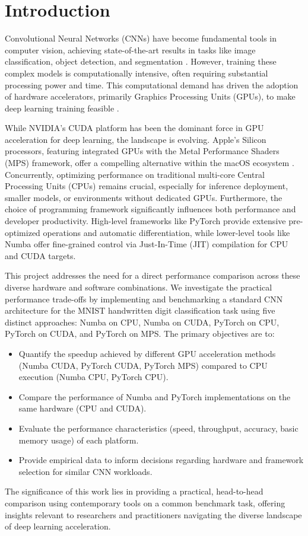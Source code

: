 \documentclass[conference]{IEEEtran} %
\begin{document}

\section{Introduction}
\label{sec:introduction}
Convolutional Neural Networks (CNNs) have become fundamental tools in computer vision, achieving state-of-the-art results in tasks like image classification, object detection, and segmentation \cite{Krizhevsky2012}. However, training these complex models is computationally intensive, often requiring substantial processing power and time. This computational demand has driven the adoption of hardware accelerators, primarily Graphics Processing Units (GPUs), to make deep learning training feasible \cite{Krizhevsky2012, Sze2017}.

While NVIDIA's CUDA platform has been the dominant force in GPU acceleration for deep learning, the landscape is evolving. Apple's Silicon processors, featuring integrated GPUs with the Metal Performance Shaders (MPS) framework, offer a compelling alternative within the macOS ecosystem \cite{Hubner2025}. Concurrently, optimizing performance on traditional multi-core Central Processing Units (CPUs) remains crucial, especially for inference deployment, smaller models, or environments without dedicated GPUs. Furthermore, the choice of programming framework significantly influences both performance and developer productivity. High-level frameworks like PyTorch provide extensive pre-optimized operations and automatic differentiation, while lower-level tools like Numba offer fine-grained control via Just-In-Time (JIT) compilation for CPU and CUDA targets.

This project addresses the need for a direct performance comparison across these diverse hardware and software combinations. We investigate the practical performance trade-offs by implementing and benchmarking a standard CNN architecture for the MNIST handwritten digit classification task \cite{LeCun1998} using five distinct approaches: Numba on CPU, Numba on CUDA, PyTorch on CPU, PyTorch on CUDA, and PyTorch on MPS. The primary objectives are to:
\begin{itemize}
    \item Quantify the speedup achieved by different GPU acceleration methods (Numba CUDA, PyTorch CUDA, PyTorch MPS) compared to CPU execution (Numba CPU, PyTorch CPU).
    \item Compare the performance of Numba and PyTorch implementations on the same hardware (CPU and CUDA).
    \item Evaluate the performance characteristics (speed, throughput, accuracy, basic memory usage) of each platform.
    \item Provide empirical data to inform decisions regarding hardware and framework selection for similar CNN workloads.
\end{itemize}
The significance of this work lies in providing a practical, head-to-head comparison using contemporary tools on a common benchmark task, offering insights relevant to researchers and practitioners navigating the diverse landscape of deep learning acceleration.
\end{document}
